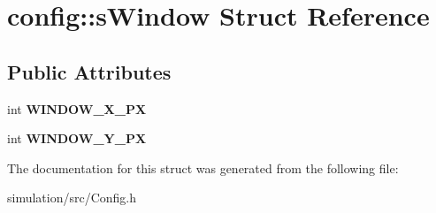 \hypertarget{structconfig_1_1s_window}{}\section{config\+:\+:s\+Window Struct Reference}
\label{structconfig_1_1s_window}
\subsection*{Public Attributes}
\begin{DoxyCompactItemize}
\item 
\mbox{\label{structconfig_1_1s_window_aed552708ff733ec85593fd96113552e0}} 
int {\bfseries W\+I\+N\+D\+O\+W\+\_\+\+X\+\_\+\+PX}
\item 
\mbox{\label{structconfig_1_1s_window_ad61587d1e8b181ead0b2bd6b60f81dec}} 
int {\bfseries W\+I\+N\+D\+O\+W\+\_\+\+Y\+\_\+\+PX}
\end{DoxyCompactItemize}


The documentation for this struct was generated from the following file\+:\begin{DoxyCompactItemize}
\item 
simulation/src/Config.\+h\end{DoxyCompactItemize}
